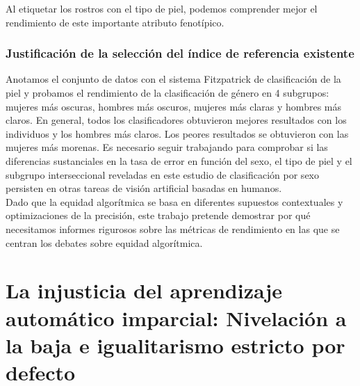 Al etiquetar los rostros con el tipo de piel, podemos comprender mejor el rendimiento de este importante atributo fenotípico.


\subsection{Justificación de la selección del índice de referencia existente}

Anotamos el conjunto de datos con el sistema Fitzpatrick de clasificación de la piel y probamos el rendimiento de la clasificación de género en 4 subgrupos: mujeres más oscuras, hombres más oscuros, mujeres más claras y hombres más claros. En general, todos los clasificadores obtuvieron mejores resultados con los individuos y los hombres más claros. Los peores resultados se obtuvieron con las mujeres más morenas. Es necesario seguir trabajando para comprobar si las diferencias sustanciales en la tasa de error en función del sexo, el tipo de piel y el subgrupo interseccional reveladas en este estudio de clasificación por sexo persisten en otras tareas de visión artificial basadas en humanos.\\

Dado que la equidad algorítmica se basa en diferentes supuestos contextuales y optimizaciones de la precisión, este trabajo pretende demostrar por qué necesitamos informes rigurosos sobre las métricas de rendimiento en las que se centran los debates sobre equidad algorítmica.


\chapter{La injusticia del aprendizaje automático imparcial: Nivelación a la baja e igualitarismo estricto por defecto}
